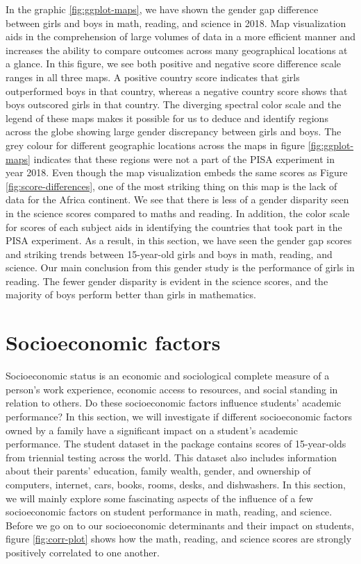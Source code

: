 In the graphic \ref{fig:ggplot-maps}, we have shown the gender gap
difference between girls and boys in math, reading, and science in 2018.
Map visualization aids in the comprehension of large volumes of data in
a more efficient manner and increases the ability to compare outcomes
across many geographical locations at a glance. In this figure, we see
both positive and negative score difference scale ranges in all three
maps. A positive country score indicates that girls outperformed boys in
that country, whereas a negative country score shows that boys outscored
girls in that country. The diverging spectral color scale and the legend
of these maps makes it possible for us to deduce and identify regions
across the globe showing large gender discrepancy between girls and
boys. The grey colour for different geographic locations across the maps
in figure \ref{fig:ggplot-maps} indicates that these regions were not a
part of the PISA experiment in year 2018. Even though the map
visualization embeds the same scores as Figure
\ref{fig:score-differences}, one of the most striking thing on this map
is the lack of data for the Africa continent. We see that there is less
of a gender disparity seen in the science scores compared to maths and
reading. In addition, the color scale for scores of each subject aids in
identifying the countries that took part in the PISA experiment. As a
result, in this section, we have seen the gender gap scores and striking
trends between 15-year-old girls and boys in math, reading, and science.
Our main conclusion from this gender study is the performance of girls
in reading. The fewer gender disparity is evident in the science scores,
and the majority of boys perform better than girls in mathematics.

\hypertarget{socioeconomic-factors}{%
\section{Socioeconomic factors}\label{socioeconomic-factors}}

Socioeconomic status is an economic and sociological complete measure of
a person's work experience, economic access to resources, and social
standing in relation to others. Do these socioeconomic factors influence
students' academic performance? In this section, we will investigate if
different socioeconomic factors owned by a family have a significant
impact on a student's academic performance. The student dataset in the
 package contains scores of 15-year-olds from
triennial testing across the world. This dataset also includes
information about their parents' education, family wealth, gender, and
ownership of computers, internet, cars, books, rooms, desks, and
dishwashers. In this section, we will mainly explore some fascinating
aspects of the influence of a few socioeconomic factors on student
performance in math, reading, and science. Before we go on to our
socioeconomic determinants and their impact on students, figure
\ref{fig:corr-plot} shows how the math, reading, and science scores are
strongly positively correlated to one another.

